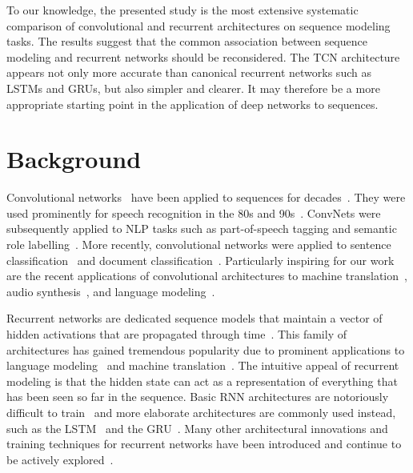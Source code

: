 \documentclass{article}
\begin{document}
To our knowledge, the presented study is the most extensive systematic comparison of convolutional and recurrent architectures on sequence modeling tasks. The results suggest that the common association between sequence modeling and recurrent networks should be reconsidered. The TCN architecture appears not only more accurate than canonical recurrent networks such as LSTMs and GRUs, but also simpler and clearer. It may therefore be a more appropriate starting point in the application of deep networks to sequences. 


\section{Background}
\label{sec:background}

Convolutional networks~\cite{LeCun1989} have been applied to sequences for decades~\cite{sejnowski,hintonConnectionist}. They were used prominently for speech recognition in the 80s and 90s~\cite{waibel,bottou}. ConvNets were subsequently applied to NLP tasks such as part-of-speech tagging and semantic role labelling~\cite{collobertUnified,Collobert2011,Santos2014:ICML}. More recently, convolutional networks were applied to sentence classification~\cite{kalchbrennerGB14,kim2014convolutional} and document classification~\cite{Zhang2015:NIPS,Conneau2017,Johnson2015,Johnson2017}. Particularly inspiring for our work are the recent applications of convolutional architectures to machine translation~\cite{kalchbrenner2016neural,Gehring2017:ACL,gehring2017convolutional}, audio synthesis~\cite{waveNet}, and language modeling~\cite{dauphinGatedConv}.

Recurrent networks are dedicated sequence models that maintain a vector of hidden activations that are propagated through time~\cite{Elman90findstructure,Werbos1990,Graves2012}. This family of architectures has gained tremendous popularity due to prominent applications to language modeling~\cite{Sutskever2011,graves2013generating,Hermans2013} and machine translation~\cite{sutskeverSeqToSeq,Bahdanau2015}. The intuitive appeal of recurrent modeling is that the hidden state can act as a representation of everything that has been seen so far in the sequence. Basic RNN architectures are notoriously difficult to train~\citep{bengio1994learning,pascanu2013difficulty} and more elaborate architectures are commonly used instead, such as the LSTM~\cite{hochreiterLSTM} and the GRU~\cite{choGRU}. Many other architectural innovations and training techniques for recurrent networks have been introduced and continue to be actively explored~\cite{HihiBengio1995,Schuster1997,gers2002learning,koutnikClockwork,leIRNN,Ba2016layer,wuMIRNN,kruegerZoneout,merityRegOpt,campos2018skip}.
\end{document}
